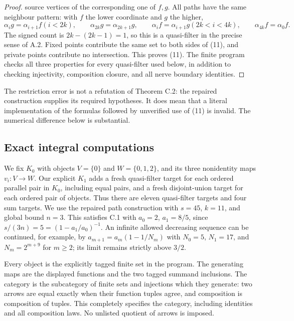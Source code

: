 \documentclass[11pt,a4paper]{article}
\theoremstyle{definition}
\begin{document}
\begin{proof}
source vertices of the corresponding one of $f,g$.  All paths have the same
neighbour pattern: with $f$ the lower coordinate and $g$ the higher,
\[
 \alpha_i g=\alpha_{i+1}f (i<2k),\qquad
 \alpha_{2k}g=\alpha_{2k+1}g,\qquad
 \alpha_i f=\alpha_{i+1}g (2k<i<4k),\qquad
 \alpha_{4k}f=\alpha_0f.
\]
The signed count is $2k-(2k-1)=1$, so this is a quasi-filter in the
precise sense of A.2.  Fixed points contribute the same set to both
sides of (11), and private points contribute no intersection.  This
proves (11).  The finite program checks all three properties for every
quasi-filter used below, in addition to checking injectivity, composition
closure, and all nerve boundary identities.
\end{proof}

The restriction error is not a refutation of Theorem C.2: the repaired
construction supplies its required hypotheses.  It does mean that a
literal implementation of the formulas followed by unverified use of
(11) is invalid.  The numerical difference below is substantial.

\subsection{Exact integral computations}
We fix $K_0$ with objects $V=\{0\}$ and $W=\{0,1,2\}$, and its three
nonidentity maps $v_i:V\to W$.  Our explicit $K_1$ adds a fresh
quasi-filter target for each ordered parallel pair in $K_0$, including
equal pairs, and a fresh disjoint-union target for each ordered pair of
objects.  Thus there are eleven quasi-filter targets and four sum
targets.  We use the repaired path construction with $s=45$, $k=11$,
and global bound $n=3$.  This satisfies C.1 with
$a_0=2$, $a_1=8/5$, since $s/(3n)=5=(1-a_1/a_0)^{-1}$.
An infinite allowed decreasing sequence can be continued, for example,
by $a_{m+1}=a_m(1-1/N_m)$ with $N_0=5$, $N_1=17$, and
$N_m=2^{m+9}$ for $m\geq2$; its limit remains strictly above $3/2$.

Every object is the explicitly tagged finite set in the program.
The generating maps are the displayed functions and the two tagged
summand inclusions.  The category is the subcategory of finite sets and
injections which they generate: two arrows are equal exactly when their
function tuples agree, and composition is composition of tuples.
This completely specifies the category, including identities and all
composition laws.  No unlisted quotient of arrows is imposed.
\end{document}
